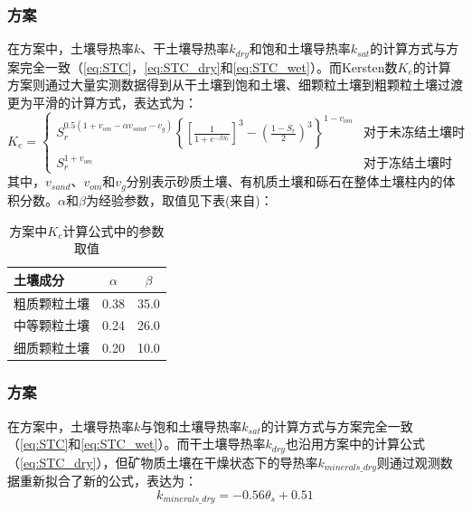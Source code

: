 \subsubsection{\citet{balland2005}方案}
在\citet{balland2005}方案中，土壤导热率$k$、干土壤导热率$k_{dry}$和饱和土壤导热率$k_{sat}$的计算方式与\citet{Johansen1975}方案完全一致（\ref{eq:STC}，\ref{eq:STC_dry}和\ref{eq:STC_wet}）。而Kersten数$K_e$的计算方案则通过大量实测数据得到从干土壤到饱和土壤、细颗粒土壤到粗颗粒土壤过渡更为平滑的计算方式，表达式为：
\begin{equation}
K_e=\begin{cases}
S_r^{0.5(1+v_{om}-\alpha v_{sand}-v_g)}\left\{\left[\frac{1}{1+e^{-\beta S_r}}\right]^3-\left(\frac{1-S_r}{2}\right)^3\right\}^{1-v_{om}} & \text {对于未冻结土壤时} \\ 
S_r^{1+v_{om}} & \text {对于冻结土壤时}
\end{cases}
\end{equation}
其中，$v_{sand}$、$v_{om}$和$v_g$分别表示砂质土壤、有机质土壤和砾石在整体土壤柱内的体积分数。$\alpha$和$\beta$为经验参数，取值见下表(来自\citet{Barry2015thermal})：
\begin{table}[htbp]
    \centering
    \caption{\citet{balland2005}方案中$K_e$计算公式中的参数取值}
    \begin{tabular}{@{}lcc@{}}
    \toprule
    土壤成分               & $\alpha$     & $\beta$  \\
    \midrule
    粗质颗粒土壤                  & 0.38      & 35.0  \\
    中等颗粒土壤                  & 0.24    & 26.0   \\
    细质颗粒土壤         & 0.20   & 10.0    \\
    \bottomrule
    \end{tabular}
\end{table}

\subsubsection{\citet{lu2007improved}方案}
在\citet{lu2007improved}方案中，土壤导热率$k$与饱和土壤导热率$k_{sat}$的计算方式与\citet{Johansen1975}方案完全一致（\ref{eq:STC}和\ref{eq:STC_wet}）。而干土壤导热率$k_{dry}$也沿用\citet{Johansen1975}方案中的计算公式（\ref{eq:STC_dry}），但矿物质土壤在干燥状态下的导热率$k_{minerals\_dry}$则通过观测数据重新拟合了新的公式，表达为：
\begin{equation}\label{eq:STC_dry_Lu}
k_{minerals\_dry}=-0.56\theta_s+0.51
\end{equation}

